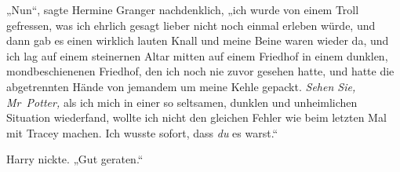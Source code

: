 „Nun“, sagte Hermine Granger nachdenklich, „ich wurde von einem Troll gefressen, was ich ehrlich gesagt lieber nicht noch einmal erleben würde, und dann gab es einen wirklich lauten Knall und meine Beine waren wieder da, und ich lag auf einem steinernen Altar mitten auf einem Friedhof in einem dunklen, mondbeschienenen Friedhof, den ich noch nie zuvor gesehen hatte, und hatte die abgetrennten Hände von jemandem um meine Kehle gepackt. \emph{Sehen Sie, Mr~Potter,} als ich mich in einer so seltsamen, dunklen und unheimlichen Situation wiederfand, wollte ich nicht den gleichen Fehler wie beim letzten Mal mit Tracey machen. Ich wusste sofort, dass \emph{du} es warst.“

Harry nickte. „Gut geraten.“

